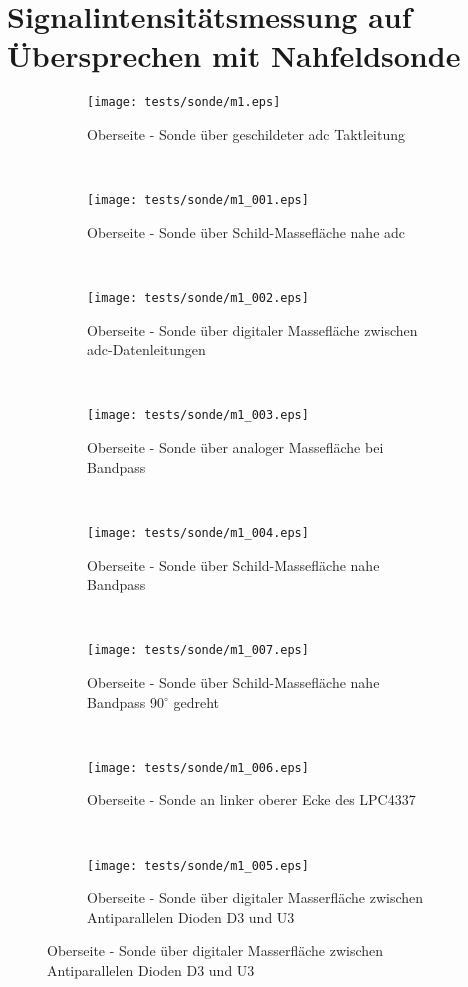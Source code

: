 \section{Signalintensitätsmessung auf Übersprechen mit Nahfeldsonde}\label{sec:signal_db}
\begin{figure}[h!]
  \centering
  \begin{subfigure}[t]{0.48\textwidth}
	\centering
  	\texttt{[image: tests/sonde/m1.eps]}  
  	\caption{Oberseite - Sonde über geschildeter \ac{adc} Taktleitung}
  	\label{fig:m1}
  \end{subfigure}
  ~
  \begin{subfigure}[t]{0.48\textwidth}
	\centering
  	\texttt{[image: tests/sonde/m1\_001.eps]}  
  \caption{Oberseite - Sonde über Schild-Massefläche nahe \ac{adc}}
  \label{fig:m2}
  \end{subfigure}
  ~
  \begin{subfigure}[t]{0.48\textwidth}
	\centering
  	\texttt{[image: tests/sonde/m1\_002.eps]}  
  	  \caption{Oberseite - Sonde über digitaler Massefläche zwischen \ac{adc}-Datenleitungen}
  \label{fig:m2}
  \end{subfigure}
  ~
  \begin{subfigure}[t]{0.48\textwidth}
	\centering
  	\texttt{[image: tests/sonde/m1\_003.eps]}  
  	\caption{Oberseite - Sonde über analoger Massefläche bei Bandpass}
  \label{fig:m2}
  \end{subfigure}
  ~
  \begin{subfigure}[t]{0.48\textwidth}
	\centering
  	\texttt{[image: tests/sonde/m1\_004.eps]}  
  	\caption{Oberseite - Sonde über Schild-Massefläche nahe Bandpass}
  \label{fig:m2}
  \end{subfigure}
  ~
  \begin{subfigure}[t]{0.48\textwidth}
	\centering
  	\texttt{[image: tests/sonde/m1\_007.eps]}  
  	\caption{Oberseite - Sonde über Schild-Massefläche nahe Bandpass 90$^\circ$ gedreht}
  \label{fig:m2}
  \end{subfigure}
  ~
  \begin{subfigure}[t]{0.48\textwidth}
	\centering
  	\texttt{[image: tests/sonde/m1\_006.eps]}  
  	\caption{Oberseite - Sonde an linker oberer Ecke des LPC4337}
  \label{fig:m2}
  \end{subfigure}
  ~
  \begin{subfigure}[t]{0.48\textwidth}
	\centering
  	\texttt{[image: tests/sonde/m1\_005.eps]}  
  	\caption{Oberseite - Sonde über digitaler Masserfläche zwischen Antiparallelen Dioden D3 und U3}
  \label{fig:m2}
  \end{subfigure}
\end{figure}
